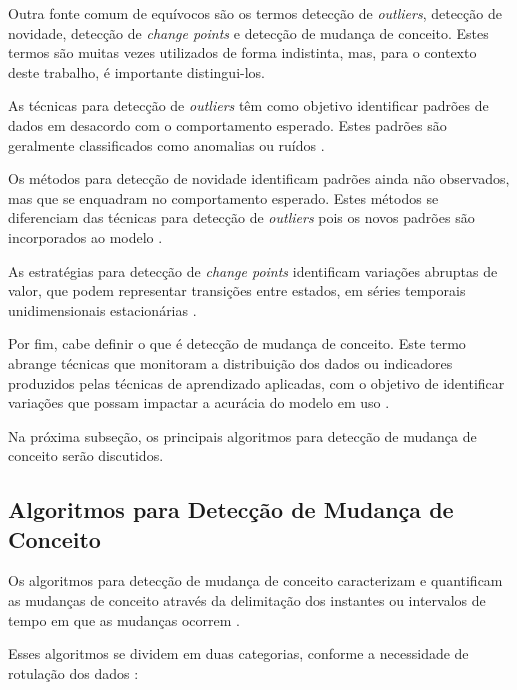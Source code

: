 \documentclass[msc, classic, a4paper]{ufbathesis}
\begin{document}
Outra fonte comum de equívocos são os termos detecção de \textit{outliers}, detecção de novidade, detecção de \textit{change points} e detecção de mudança de conceito.
Estes termos são muitas vezes utilizados de forma indistinta, mas, para o contexto deste trabalho, é importante distingui-los.

As técnicas para detecção de \textit{outliers} têm como objetivo identificar padrões de dados em desacordo com o comportamento esperado. Estes padrões são geralmente classificados como anomalias ou ruídos \cite{Chandola:2009:ADS:1541880.1541882}.

Os métodos para detecção de novidade identificam padrões ainda não observados, mas que se enquadram no comportamento esperado.
Estes métodos se diferenciam das técnicas para detecção de \textit{outliers} pois os novos padrões são incorporados ao modelo \cite{Chandola:2009:ADS:1541880.1541882}.

As estratégias para detecção de \textit{change points} identificam variações abruptas de valor, que podem representar transições entre estados, em séries temporais unidimensionais estacionárias \cite{Aminikhanghahi:2017:SMT:3086013.3086037}.

Por fim,  cabe definir o que é detecção de mudança de conceito.
Este termo abrange técnicas que monitoram a distribuição dos dados ou indicadores produzidos pelas técnicas de aprendizado aplicadas, com o objetivo de identificar variações que possam impactar a acurácia do modelo em uso \cite{Gama:2014:SCD:2597757.2523813}.

Na próxima subseção, os principais algoritmos para detecção de mudança de conceito serão discutidos.

\subsection{Algoritmos para Detecção de Mudança de Conceito}

Os algoritmos para detecção de mudança de conceito caracterizam e quantificam as mudanças de conceito através da delimitação dos instantes ou intervalos de tempo em que as mudanças ocorrem \cite{Basseville:1993:DAC:151741}.

Esses algoritmos se dividem em duas categorias, conforme a necessidade de rotulação dos dados \cite{Zliobaite:2010}:
\end{document}
